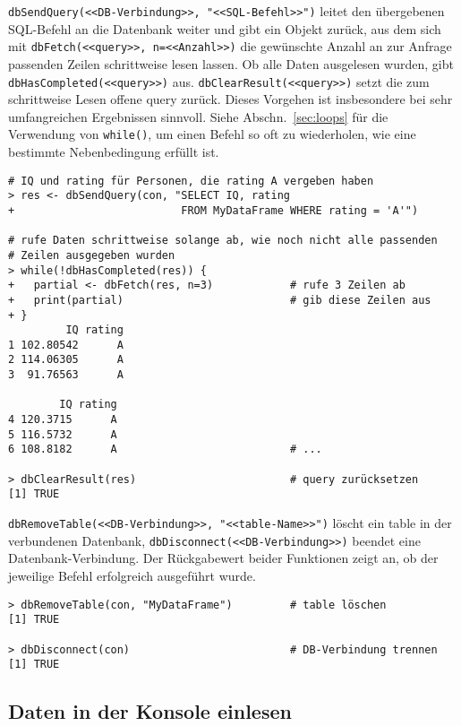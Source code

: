 \lstinline!dbSendQuery(<<DB-Verbindung>>, "<<SQL-Befehl>>")!  leitet den übergebenen SQL-Befehl an die Datenbank weiter und gibt ein Objekt zurück, aus dem sich mit \lstinline!dbFetch(<<query>>, n=<<Anzahl>>)! die gewünschte Anzahl an zur Anfrage passenden Zeilen schrittweise lesen lassen. Ob alle Daten ausgelesen wurden, gibt \lstinline!dbHasCompleted(<<query>>)! aus. \lstinline!dbClearResult(<<query>>)! setzt die zum schrittweise Lesen offene query zurück. Dieses Vorgehen ist insbesondere bei sehr umfangreichen Ergebnissen sinnvoll. Siehe Abschn.\ \ref{sec:loops} für die Verwendung von \lstinline!while()!, um einen Befehl so oft zu wiederholen, wie eine bestimmte Nebenbedingung erfüllt ist.
\begin{lstlisting}
# IQ und rating für Personen, die rating A vergeben haben
> res <- dbSendQuery(con, "SELECT IQ, rating
+                          FROM MyDataFrame WHERE rating = 'A'")

# rufe Daten schrittweise solange ab, wie noch nicht alle passenden
# Zeilen ausgegeben wurden
> while(!dbHasCompleted(res)) {
+   partial <- dbFetch(res, n=3)            # rufe 3 Zeilen ab
+   print(partial)                          # gib diese Zeilen aus
+ }
         IQ rating
1 102.80542      A
2 114.06305      A
3  91.76563      A

        IQ rating
4 120.3715      A
5 116.5732      A
6 108.8182      A                           # ...

> dbClearResult(res)                        # query zurücksetzen
[1] TRUE
\end{lstlisting}

\lstinline!dbRemoveTable(<<DB-Verbindung>>, "<<table-Name>>")! löscht ein table in der verbundenen Datenbank, \lstinline!dbDisconnect(<<DB-Verbindung>>)! beendet eine Datenbank-Verbindung. Der Rückgabewert beider Funktionen zeigt an, ob der jeweilige Befehl erfolgreich ausgeführt wurde.
\begin{lstlisting}
> dbRemoveTable(con, "MyDataFrame")         # table löschen
[1] TRUE

> dbDisconnect(con)                         # DB-Verbindung trennen
[1] TRUE
\end{lstlisting}

\subsection{Daten in der Konsole einlesen}
\label{sec:scan}

